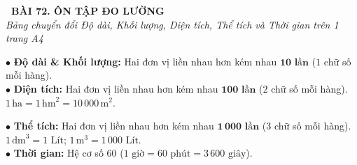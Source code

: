 \documentclass[14pt,a4paper,oneside]{extbook}
\begin{document}
\noindent
\begin{tcolorbox}[
  enhanced,
  colback=teal!8!white,
  colframe=teal!80!black,
  arc=3mm,
  boxrule=1.1pt,
  width=\linewidth,
  halign=center,
  top=2.2mm, bottom=2.2mm,
  left=3mm, right=3mm,
  drop fuzzy shadow
]
  {\large\bfseries\color{teal!95!black}\faBookmark\ BÀI 72. ÔN TẬP ĐO LƯỜNG}\\[2pt]
  {\scriptsize\color{black!75}\itshape Bảng chuyển đổi Độ dài, Khối lượng, Diện tích, Thể tích và Thời gian trên 1 trang A4}
\end{tcolorbox}

\vspace{3.2mm}
\noindent
\begin{minipage}[t]{0.52\textwidth}
  \begin{tcolorbox}[
    enhanced,
    title={\footnotesize\bfseries\color{white}\faBalanceScale\ 1. Độ dài, Khối lượng \& Diện tích},
    colback=blue!2!white,
    colframe=blue!75!black,
    arc=2.5mm, boxrule=0.8pt, top=1.8mm, bottom=1.8mm, left=2.2mm, right=2.2mm
  ]
    \footnotesize
    $\bullet$ \textbf{Độ dài \& Khối lượng:} Hai đơn vị liền nhau hơn kém nhau $\mathbf{10\text{ lần}}$ ($1$ chữ số mỗi hàng).\\
    $\bullet$ \textbf{Diện tích:} Hai đơn vị liền nhau hơn kém nhau $\mathbf{100\text{ lần}}$ ($2$ chữ số mỗi hàng).\\
    $1\,\text{ha} = 1\,\text{hm}^2 = 10\,000\,\text{m}^2$.
  \end{tcolorbox}
\end{minipage}%
\hfill
\begin{minipage}[t]{0.46\textwidth}
  \begin{tcolorbox}[
    enhanced,
    title={\footnotesize\bfseries\color{white}\faClockO\ 2. Thể tích \& Thời gian},
    colback=teal!2!white,
    colframe=teal!75!black,
    arc=2.5mm, boxrule=0.8pt, top=1.8mm, bottom=1.8mm, left=2mm, right=2mm
  ]
    \footnotesize
    $\bullet$ \textbf{Thể tích:} Hai đơn vị liền nhau hơn kém nhau $\mathbf{1\,000\text{ lần}}$ ($3$ chữ số mỗi hàng).\\
    $1\,\text{dm}^3 = 1\text{ Lít}$; $1\,\text{m}^3 = 1\,000\text{ Lít}$.\\
    $\bullet$ \textbf{Thời gian:} Hệ cơ số $60$ ($1\text{ giờ} = 60\text{ phút} = 3\,600\text{ giây}$).
  \end{tcolorbox}
\end{minipage}

\vspace{3mm}
\end{document}
